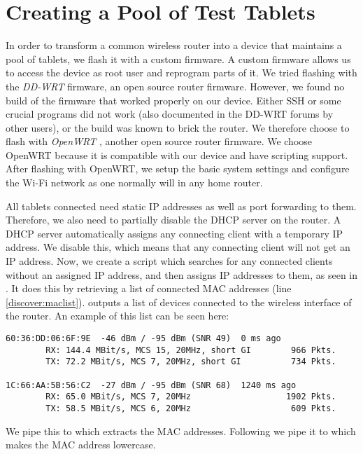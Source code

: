 \section{Creating a Pool of Test Tablets}\label{sec:pool_of_tablets}
In order to transform a common wireless router into a device that maintains a pool of tablets, we flash it with a custom firmware. A custom firmware allows us to access the device as root user and reprogram parts of it. We tried flashing with the \emph{DD-WRT} \parencite{ddwrt} firmware, an open source router firmware. However, we found no build of the firmware that worked properly on our device. Either SSH or some crucial programs did not work (also documented in the DD-WRT forums by other users), or the build was known to brick the router. We therefore choose to flash with \emph{OpenWRT} \parencite{openwrt}, another open source router firmware. We choose OpenWRT because it is compatible with our device and have scripting support. After flashing with OpenWRT, we setup the basic system settings and configure the Wi-Fi network as one normally will in any home router.

All tablets connected need static IP addresses as well as port forwarding to them. Therefore, we also need to partially disable the DHCP server on the router. A DHCP server automatically assigns any connecting client with a temporary IP address. We disable this, which means that any connecting client will not get an IP address. Now, we create a script which searches for any connected clients without an assigned IP address, and then assigns IP addresses to them, as seen in . It does this by retrieving a list of connected MAC addresses (line \ref{discover:maclist}).  outputs a list of devices connected to the wireless interface  of the router. An example of this list can be seen here:
\begin{lstlisting}[language={}]
60:36:DD:06:6F:9E  -46 dBm / -95 dBm (SNR 49)  0 ms ago
        RX: 144.4 MBit/s, MCS 15, 20MHz, short GI        966 Pkts.
        TX: 72.2 MBit/s, MCS 7, 20MHz, short GI          734 Pkts.

1C:66:AA:5B:56:C2  -27 dBm / -95 dBm (SNR 68)  1240 ms ago
        RX: 65.0 MBit/s, MCS 7, 20MHz                   1902 Pkts.
        TX: 58.5 MBit/s, MCS 6, 20MHz                    609 Pkts.
\end{lstlisting}

We pipe this to  which extracts the MAC addresses. Following we pipe it to  which makes the MAC address lowercase.

